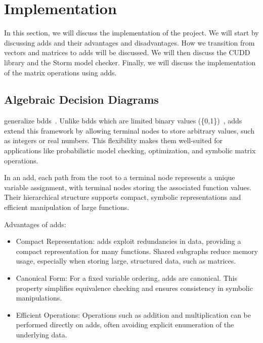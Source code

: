 \section{Implementation}\label{sec:implementation}
In this section, we will discuss the implementation of the project.
We will start by discussing \glspl{add} and their advantages and disadvantages.
How we transition from vectors and matrices to \glspl{add} will be discussed.
We will then discuss the CUDD library and the Storm model checker.
Finally, we will discuss the implementation of the matrix operations using \glspl{add}.


\subsection{Algebraic Decision Diagrams}\label{subsec:algebraic-decision-diagrams}
 generalize \glspl{bdd}~\cite{bahar1997algebric}.
Unlike \glspl{bdd} which are limited binary values (\{0,1\})~\cite{bryant1986graph}, \glspl{add} extend this framework by allowing terminal nodes to store arbitrary values, such as integers or real numbers. 
This flexibility makes them well-suited for applications like probabilistic model checking, optimization, and symbolic matrix operations.

In an \gls{add}, each path from the root to a terminal node represents a unique variable assignment, with terminal nodes storing the associated function values.
Their hierarchical structure supports compact, symbolic representations and efficient manipulation of large functions.

Advantages of \glspl{add}:
\begin{itemize}
\item Compact Representation: \glspl{add} exploit redundancies in data, providing a compact representation for many functions. Shared subgraphs reduce memory usage, especially when storing large, structured data, such as matrices.
\item Canonical Form: For a fixed variable ordering, \glspl{add} are canonical. This property simplifies equivalence checking and ensures consistency in symbolic manipulations.
\item Efficient Operations: Operations such as addition and multiplication can be performed directly on \glspl{add}, often avoiding explicit enumeration of the underlying data.
\end{itemize}


